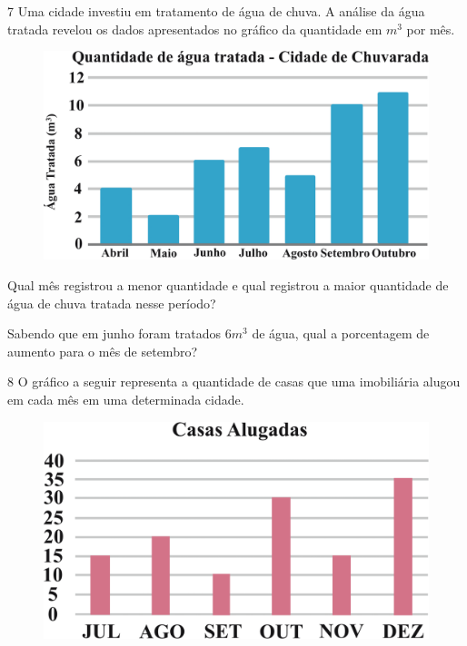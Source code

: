 \pagebreak  
\num{7} Uma cidade investiu em tratamento de água de chuva. A análise da água
tratada revelou os dados apresentados no gráfico da quantidade em $m^3$ por
mês.

\begin{figure}[htpb!]
\centering
\includegraphics[width=\textwidth]{./ilustras-mat/modulo_13-atividade_7.png}
\end{figure}

\begin{escolha}

  \item Qual mês registrou a menor quantidade e qual registrou a maior
  quantidade de água de chuva tratada nesse período?


  \item Sabendo que em junho foram tratados $6m^3$ de água, qual a porcentagem
  de aumento para o mês de setembro?

\end{escolha}

\pagebreak
\num{8} O gráfico a seguir representa a quantidade de casas que uma
imobiliária alugou em cada mês em uma determinada cidade.

\begin{figure}[htpb!]
\centering
\includegraphics[width=.6\textwidth]{./ilustras-mat/modulo_13-atividade_8.png}
\end{figure}

